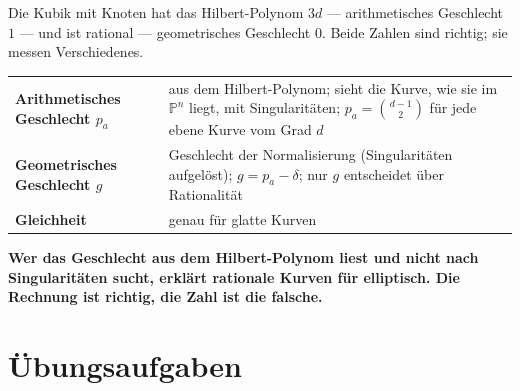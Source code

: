 \begin{warnung}
Die Kubik mit Knoten hat das Hilbert-Polynom $3d$ --- arithmetisches Geschlecht $1$ --- und ist rational --- geometrisches Geschlecht $0$. Beide Zahlen sind richtig; sie messen Verschiedenes.

\begin{center}
{\small
\renewcommand{\arraystretch}{1.5}
\begin{tabular}{@{}P{3.0cm}P{5.8cm}@{}}
\toprule
\textbf{Arithmetisches Geschlecht $p_a$} & aus dem Hilbert-Polynom; sieht die Kurve, wie sie im $\mathbb P^{n}$ liegt, mit Singularitäten; $p_a = \binom{d-1}{2}$ für jede ebene Kurve vom Grad $d$\\
\textbf{Geometrisches Geschlecht $g$} & Geschlecht der Normalisierung (Singularitäten aufgelöst); $g = p_a - \delta$; nur $g$ entscheidet über Rationalität\\
\textbf{Gleichheit} & genau für glatte Kurven\\
\bottomrule
\end{tabular}}
\end{center}

\begin{center}
\begin{minipage}{0.9\textwidth}
\textbf{Wer das Geschlecht aus dem Hilbert-Polynom liest und nicht nach Singularitäten sucht, erklärt rationale Kurven für elliptisch. Die Rechnung ist richtig, die Zahl ist die falsche.}
\end{minipage}
\end{center}

\begin{center}
\begin{minipage}{0.88\textwidth}
\end{minipage}
\end{center}
\end{warnung}

\section{Übungsaufgaben}


